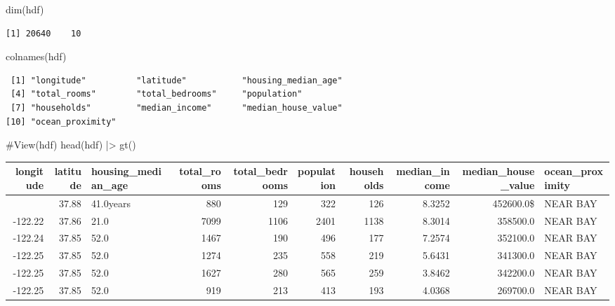 \documentclass[
  letterpaper,
  DIV=11,
  numbers=noendperiod]{scrreprt}
\newenvironment{Shaded}{\begin{snugshade}}{\end{snugshade}}
\newcommand{\CommentTok}[1]{\textcolor[rgb]{0.37,0.37,0.37}{#1}}
\newcommand{\FunctionTok}[1]{\textcolor[rgb]{0.28,0.35,0.67}{#1}}
\newcommand{\NormalTok}[1]{\textcolor[rgb]{0.00,0.23,0.31}{#1}}
\newcommand{\SpecialCharTok}[1]{\textcolor[rgb]{0.37,0.37,0.37}{#1}}
\begin{document}
\begin{Shaded}
\begin{Highlighting}[]
\FunctionTok{dim}\NormalTok{(hdf)}
\end{Highlighting}
\end{Shaded}

\begin{verbatim}
[1] 20640    10
\end{verbatim}

\begin{Shaded}
\begin{Highlighting}[]
\FunctionTok{colnames}\NormalTok{(hdf)}
\end{Highlighting}
\end{Shaded}

\begin{verbatim}
 [1] "longitude"          "latitude"           "housing_median_age"
 [4] "total_rooms"        "total_bedrooms"     "population"        
 [7] "households"         "median_income"      "median_house_value"
[10] "ocean_proximity"   
\end{verbatim}

\begin{Shaded}
\begin{Highlighting}[]
\CommentTok{\#View(hdf)}
\FunctionTok{head}\NormalTok{(hdf) }\SpecialCharTok{|\textgreater{}}
  \FunctionTok{gt}\NormalTok{()}
\end{Highlighting}
\end{Shaded}

\begin{table}
\fontsize{12.0pt}{14.4pt}\selectfont
\begin{tabular*}{\linewidth}{@{\extracolsep{\fill}}rrlrrrrrrl}
\toprule
longitude & latitude & housing\_median\_age & total\_rooms & total\_bedrooms & population & households & median\_income & median\_house\_value & ocean\_proximity \\ 
\midrule\addlinespace[2.5pt]
-122.23 & 37.88 & 41.0years & 880 & 129 & 322 & 126 & 8.3252 & 452600.0\$ & NEAR BAY \\ 
-122.22 & 37.86 & 21.0 & 7099 & 1106 & 2401 & 1138 & 8.3014 & 358500.0 & NEAR BAY \\ 
-122.24 & 37.85 & 52.0 & 1467 & 190 & 496 & 177 & 7.2574 & 352100.0 & NEAR BAY \\ 
-122.25 & 37.85 & 52.0 & 1274 & 235 & 558 & 219 & 5.6431 & 341300.0 & NEAR BAY \\ 
-122.25 & 37.85 & 52.0 & 1627 & 280 & 565 & 259 & 3.8462 & 342200.0 & NEAR BAY \\ 
-122.25 & 37.85 & 52.0 & 919 & 213 & 413 & 193 & 4.0368 & 269700.0 & NEAR BAY \\ 
\bottomrule
\end{tabular*}
\end{table}
\end{document}
